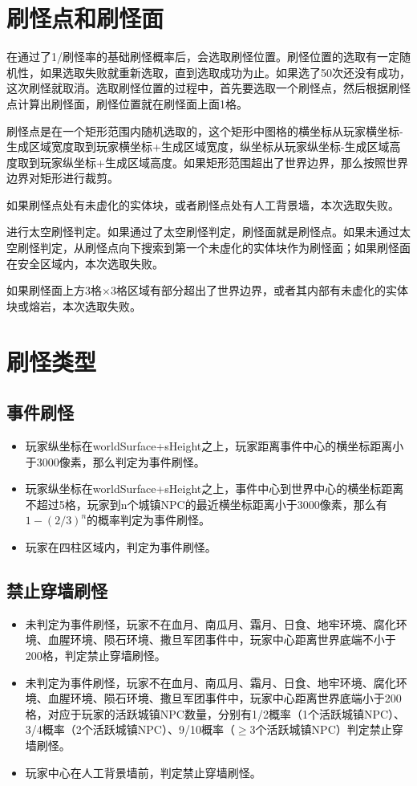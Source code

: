 \section{刷怪点和刷怪面}
在通过了1/刷怪率的基础刷怪概率后，会选取刷怪位置。刷怪位置的选取有一定随机性，如果选取失败就重新选取，直到选取成功为止。如果选了50次还没有成功，这次刷怪就取消。选取刷怪位置的过程中，首先要选取一个刷怪点，然后根据刷怪点计算出刷怪面，刷怪位置就在刷怪面上面1格。

刷怪点是在一个矩形范围内随机选取的，这个矩形中图格的横坐标从玩家横坐标-生成区域宽度取到玩家横坐标+生成区域宽度，纵坐标从玩家纵坐标-生成区域高度取到玩家纵坐标+生成区域高度。如果矩形范围超出了世界边界，那么按照世界边界对矩形进行裁剪。

如果刷怪点处有未虚化的实体块，或者刷怪点处有人工背景墙，本次选取失败。

进行太空刷怪判定。如果通过了太空刷怪判定，刷怪面就是刷怪点。如果未通过太空刷怪判定，从刷怪点向下搜索到第一个未虚化的实体块作为刷怪面；如果刷怪面在安全区域内，本次选取失败。

如果刷怪面上方3格$\times$3格区域有部分超出了世界边界，或者其内部有未虚化的实体块或熔岩，本次选取失败。

\section{刷怪类型}

\subsection{事件刷怪}
\begin{itemize}
    \item 玩家纵坐标在worldSurface+sHeight之上，玩家距离事件中心的横坐标距离小于3000像素，那么判定为事件刷怪。
    \item 玩家纵坐标在worldSurface+sHeight之上，事件中心到世界中心的横坐标距离不超过5格，玩家到n个城镇NPC的最近横坐标距离小于3000像素，那么有$1-(2/3)^n$的概率判定为事件刷怪。
    \item 玩家在四柱区域内，判定为事件刷怪。
\end{itemize}

\subsection{禁止穿墙刷怪}
\begin{itemize}
    \item 未判定为事件刷怪，玩家不在血月、南瓜月、霜月、日食、地牢环境、腐化环境、血腥环境、陨石环境、撒旦军团事件中，玩家中心距离世界底端不小于200格，判定禁止穿墙刷怪。
    \item 未判定为事件刷怪，玩家不在血月、南瓜月、霜月、日食、地牢环境、腐化环境、血腥环境、陨石环境、撒旦军团事件中，玩家中心距离世界底端小于200格，对应于玩家的活跃城镇NPC数量，分别有1/2概率（1个活跃城镇NPC）、3/4概率（2个活跃城镇NPC）、9/10概率（$\ge$3个活跃城镇NPC）判定禁止穿墙刷怪。
    \item 玩家中心在人工背景墙前，判定禁止穿墙刷怪。
\end{itemize}

